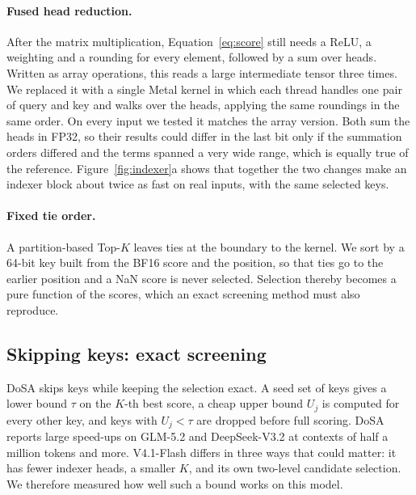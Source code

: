 \paragraph{Fused head reduction.} After the matrix multiplication, Equation~\eqref{eq:score} still needs a ReLU, a weighting and a rounding for every element, followed by a sum over heads. Written as array operations, this reads a large intermediate tensor three times. We replaced it with a single Metal kernel in which each thread handles one pair of query and key and walks over the heads, applying the same roundings in the same order. On every input we tested it matches the array version. Both sum the heads in FP32, so their results could differ in the last bit only if the summation orders differed and the terms spanned a very wide range, which is equally true of the reference. Figure~\ref{fig:indexer}a shows that together the two changes make an indexer block about twice as fast on real inputs, with the same selected keys.

\paragraph{Fixed tie order.} A partition-based Top-$K$ leaves ties at the boundary to the kernel. We sort by a 64-bit key built from the BF16 score and the position, so that ties go to the earlier position and a NaN score is never selected. Selection thereby becomes a pure function of the scores, which an exact screening method must also reproduce.

\subsection{Skipping keys: exact screening}
\label{sec:dosa}
DoSA \citep{dosa} skips keys while keeping the selection exact. A seed set of keys gives a lower bound $\tau$ on the $K$-th best score, a cheap upper bound $U_j$ is computed for every other key, and keys with $U_j<\tau$ are dropped before full scoring. DoSA reports large speed-ups on GLM-5.2 and DeepSeek-V3.2 at contexts of half a million tokens and more. V4.1-Flash differs in three ways that could matter: it has fewer indexer heads, a smaller $K$, and its own two-level candidate selection. We therefore measured how well such a bound works on this model.


